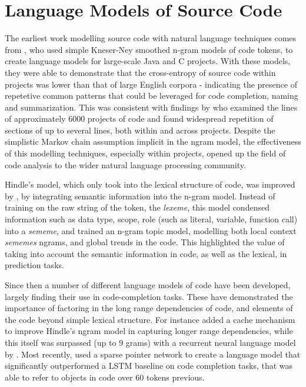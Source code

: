 
\section{Language Models of Source Code}

The earliest work modelling source code with natural language techniques comes from \citet{Hindle:2012:NS:2337223.2337322}, who used simple Kneser-Ney smoothed \citep{r._kneser_improved_1995} n-gram models of code tokens, to create language models for large-scale Java and C projects.
With these models, they were able to demonstrate that the cross-entropy of source code within projects was lower than that of large English corpora - indicating the presence of repetetive common patterns that could be leveraged for code completion, naming and summarization.
This was consistent with findings by \citet{gabel_study_2010} who examined the lines of approximately 6000 projects of code and found widespread repetition of sections of up to several lines, both within and across projects.
Despite the simplistic Markov chain assumption implicit in the ngram model, the effectiveness of this modelling techniques, especially within projects, opened up the field of code analysis to the wider natural language processing community.

Hindle's model, which only took into the lexical structure of code, was improved by \citet{nguyen_statistical_2013}, by integrating semantic information into the n-gram model.
Instead of training on the raw string of the token, the \textit{lexeme}, this model condensed information such as data type, scope, role (such as literal, variable, function call) into a \textit{sememe}, and trained an n-gram topic model, modelling both local context \textit{sememes} ngrams, and global trends in the code.
This highlighted the value of taking into account the semantic information in code, as well as the lexical, in prediction tasks.

Since then a number of different language models of code have been developed, largely finding their use in code-completion tasks. These have demonstrated the importance of factoring in the long range dependencies of code, and elements of the code beyond simple lexical structure. For instance \citet{tu_localness_nodate} added a cache mechanism to improve Hindle's ngram model in capturing longer range dependencies, while this itself was surpassed (up to 9 grams) with a recurrent neural language model by \citet{white_toward_2015}.
Most recently, \citet{bhoopchand_learning_2016} used a sparse pointer network to create a language model that significantly outperformed a LSTM baseline on code completion tasks, that was able to refer to objects in code over 60 tokens previous.

